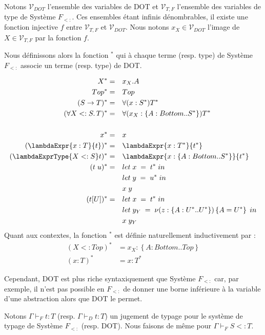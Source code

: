 Notons $\mathcal{V}_{DOT}$ l'ensemble des variables de DOT et $\mathcal{V}_{T,
  F}$ l'ensemble des variables de type de Système $F_{<:}$. Ces ensembles 
étant infinis dénombrables, il existe une fonction injective $f$ entre
$\mathcal{V}_{T, F}$ et $\mathcal{V}_{DOT}$. Nous notons $x_{X} \in
\mathcal{V}_{DOT}$ l'image de $X \in \mathcal{V}_{T, F}$ par la fonction $f$.

Nous définissons alors la fonction ${}^{*}$ qui à chaque terme (resp. type) de
Système $F_{<:}$ associe un terme (resp. type) de DOT.

\begin{align*}
  X^{*} & = && x_{X}.A \\
  Top^{*} & = && Top \\
  (S \rightarrow T)^{*} & = && \forall(x : S^{*}) T^{*} \\
  (\forall X <: S . \, T)^{*} & = && \forall(x_{X} : \left\{ A : Bottom .. S^{*} \right\}) T^{*} \\ \\
  x^{*} & = && x \\
  (\lambdaExpr{x : T}{t})^{*} & = && \lambdaExpr{x : T^{*}}{t^{*}} \\
  (\lambdaExprType{X <: S}t)^{*} & = && \lambdaExpr{x : \left\{ A : Bottom .. S^{*} \right\}}{t^{*}} \\
  (t \; u)^{*} & = && let \; x \; = \; t^{*} \; in \\
              &  && let \; y \; = \; u^{*} \; in \\
              &  && x \; y \\
   (t[U])^{*}  & = && let \; x \; = \; t^{*} \; in \\
              &  && let \; y_{Y} \; = \; \nu(z : \left\{ A : U^{*} .. U^{*} \right\}) \left\{ A = U^{*} \right\} \; in \\
              &  && x \; y_{Y}
\end{align*}
Quant aux contextes, la fonction ${}^{*}$ est définie naturellement
inductivement par :
\begin{align*}
  (X <: Top)^{*} & = x_{X} : \left\{ A : Bottom .. Top \right\} \\
  (x : T)^{*} & = x : T^{*}
\end{align*}

Cependant, DOT est plus riche syntaxiquement que Système $F_{<:}$ car, par
exemple, il n'est pas possible en $F_{<:}$ de donner une borne inférieure à la
variable d'une abstraction alors que DOT le permet.


Notons $\Gamma \vdash_{F} t : T$ (resp. $\Gamma \vdash_{D} t : T$) un jugement
de typage pour le système de typage de Système $F_{<:}$ (resp. DOT). Nous faisons
de même pour $\Gamma \vdash_{F} S <: T$.

